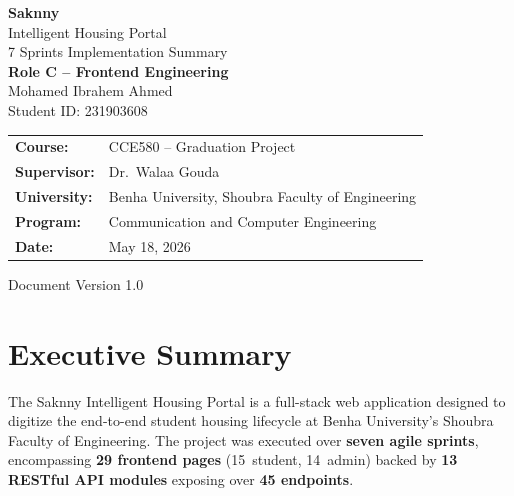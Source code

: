 \documentclass[12pt,a4paper]{article}
\begin{document}
\begin{titlepage}
    \centering
    \vspace*{3cm}

    {\Huge\bfseries\textcolor{saknnyprimary}{Saknny}}\\[0.5cm]
    {\Large\textcolor{saknnyaccent}{Intelligent Housing Portal}}\\[0.3cm]
    {\large\textcolor{saknnyprimary}{7 Sprints Implementation Summary}}\\[1.5cm]

    {\large\textbf{Role C -- Frontend Engineering}}\\[0.5cm]
    {\large Mohamed Ibrahem Ahmed}\\[0.3cm]
    {\large Student ID: 231903608}\\[2cm]

    \begin{tabular}{ll}
        \textbf{Course:}     & CCE580 -- Graduation Project \\
        \textbf{Supervisor:} & Dr.\ Walaa Gouda \\
        \textbf{University:} & Benha University, Shoubra Faculty of Engineering \\
        \textbf{Program:}    & Communication and Computer Engineering \\
        \textbf{Date:}       & May 18, 2026 \\
    \end{tabular}

    \vfill
    {\small Document Version 1.0}
\end{titlepage}

\tableofcontents
\newpage

\section{Executive Summary}

The Saknny Intelligent Housing Portal is a full-stack web application designed to digitize the end-to-end student housing lifecycle at Benha University's Shoubra Faculty of Engineering. The project was executed over \textbf{seven agile sprints}, encompassing \textbf{29 frontend pages} (15~student, 14~admin) backed by \textbf{13 RESTful API modules} exposing over \textbf{45 endpoints}.
\end{document}
